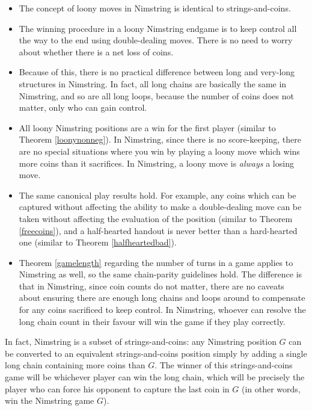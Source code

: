 \documentclass[a4paper,twocolumn]{article}
\begin{document}
\begin{itemize}
  \item The concept of loony moves in Nimstring is identical to
    strings-and-coins.
  \item The winning procedure in a loony Nimstring endgame is to keep
    control all the way to the end using double-dealing moves. There is
    no need to worry about whether there is a net loss of coins.
  \item Because of this, there is no practical difference between long
    and very-long structures in Nimstring. In fact, all long chains are
    basically the same in Nimstring, and so are all long loops, because the
    number of coins does not matter, only who can gain control.
  \item All loony Nimstring positions are a win for the first player
    (similar to Theorem \ref{loonynonneg}). In Nimstring, since there
    is no score-keeping, there are no special situations where you win
    by playing a loony move which wins more coins than it sacrifices.
    In Nimstring, a loony move is \emph{always} a losing move.
  \item The same canonical play results hold. For example, any coins
    which can be captured without affecting the ability to make a
    double-dealing move can be taken without affecting the evaluation
    of the position (similar to Theorem \ref{freecoins}), and a half-hearted
    handout is never better than a hard-hearted one (similar to Theorem
    \ref{halfheartedbad}).
  \item Theorem \ref{gamelength} regarding the number of turns in a game
    applies to Nimstring as well, so the same chain-parity guidelines hold.
    The difference is that in Nimstring, since coin counts do not matter,
    there are no caveats about ensuring there are enough long chains and loops
    around to compensate for any coins sacrificed to keep control. In
    Nimstring, whoever can resolve the long chain count in their favour
    will win the game if they play correctly.
\end{itemize}

In fact, Nimstring is a subset of strings-and-coins: any Nimstring
position $G$ can be converted to an equivalent strings-and-coins position
simply by adding a single long chain containing more coins than $G$. The
winner of this strings-and-coins game will be whichever player can win
the long chain, which will be precisely the player who can force his
opponent to capture the last coin in $G$ (in other words, win the Nimstring
game $G$).
\end{document}
